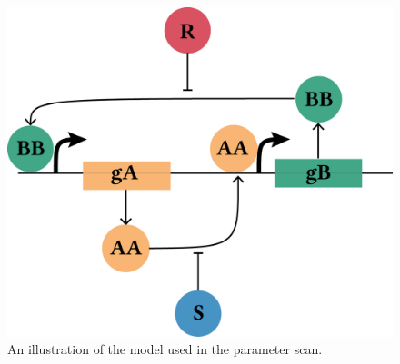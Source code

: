 \begin{figure}[tb]
	\begin{center}
\includegraphics[scale=0.6]{../../chapters/chapterABCSysBio/images/ma-switch-diagram.png}
\caption[Toggle switch model used in the parameter scan]{\label{fig:Gard_MA}An illustration of the model used in the parameter scan. }
\end{center}
\end{figure}



